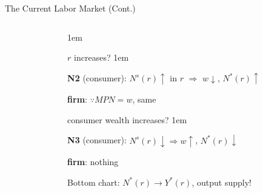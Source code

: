 \documentclass[11pt,aspectratio=43,usenames,dvipsnames]{beamer}
\let\olditemize=\itemize
\let\endolditemize=\enditemize
\renewenvironment{itemize}{\olditemize \itemsep1em}{\endolditemize}
\theoremstyle{definition}
\begin{document}
\begin{frame}{The Current Labor Market (Cont.)}
\begin{columns}
\begin{column}{0.5\textwidth}
        \end{column}
        \begin{column}{0.5\textwidth}
            \begin{itemize}
                \item $ r $ increases?
                \begin{itemize}
                    \item \textbf{N2} (consumer): $ N^{s}( r ) \uparrow  $ in $ r $ $ \Rightarrow  $ $ w \downarrow  $, $ N^{*}( r ) \uparrow  $
                    \item \textbf{firm}: $ \because MPN = w $, same
                \end{itemize}
                \item consumer wealth increases?
                \begin{itemize}
                    \item \textbf{N3} (consumer): $ N^{s}( r ) \downarrow \Rightarrow w \uparrow  $, $ N^{*}( r ) \downarrow  $
                    \item \textbf{firm}: nothing
                \end{itemize}
                \item Bottom chart: $ N^{*}( r ) \rightarrow Y^{*}( r ) $, \alert{output supply}!
            \end{itemize}
        \end{column}
    \end{columns}


\end{frame}
\end{document}
